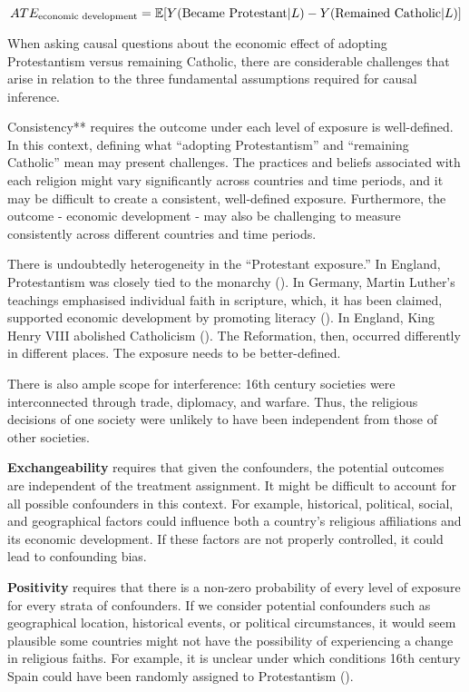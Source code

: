\documentclass[
  singlecolumn,
  9pt]{article}
\begin{document}
\[ATE_{\textnormal{economic~development}} = \mathbb{E}[Y(\textnormal{Became~Protestant}|L) - Y(\textnormal{Remained~Catholic}|L)]\]

When asking causal questions about the economic effect of adopting
Protestantism versus remaining Catholic, there are considerable
challenges that arise in relation to the three fundamental assumptions
required for causal inference.

Consistency** requires the outcome under each level of exposure is
well-defined. In this context, defining what ``adopting Protestantism''
and ``remaining Catholic'' mean may present challenges. The practices
and beliefs associated with each religion might vary significantly
across countries and time periods, and it may be difficult to create a
consistent, well-defined exposure. Furthermore, the outcome - economic
development - may also be challenging to measure consistently across
different countries and time periods.

There is undoubtedly heterogeneity in the ``Protestant exposure.'' In
England, Protestantism was closely tied to the monarchy
(). In Germany, Martin
Luther's teachings emphasised individual faith in scripture, which, it
has been claimed, supported economic development by promoting literacy
(). In England,
King Henry VIII abolished Catholicism
(). The Reformation, then,
occurred differently in different places. The exposure needs to be
better-defined.

There is also ample scope for interference: 16th century societies were
interconnected through trade, diplomacy, and warfare. Thus, the
religious decisions of one society were unlikely to have been
independent from those of other societies.

\textbf{Exchangeability} requires that given the confounders, the
potential outcomes are independent of the treatment assignment. It might
be difficult to account for all possible confounders in this context.
For example, historical, political, social, and geographical factors
could influence both a country's religious affiliations and its economic
development. If these factors are not properly controlled, it could lead
to confounding bias.

\textbf{Positivity} requires that there is a non-zero probability of
every level of exposure for every strata of confounders. If we consider
potential confounders such as geographical location, historical events,
or political circumstances, it would seem plausible some countries might
not have the possibility of experiencing a change in religious faiths.
For example, it is unclear under which conditions 16th century Spain
could have been randomly assigned to Protestantism
().
\end{document}
